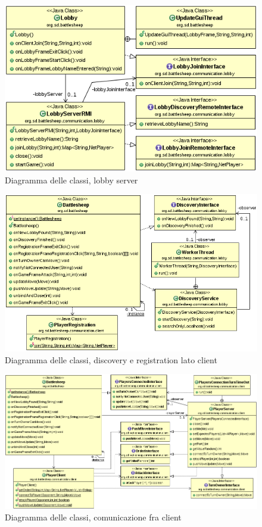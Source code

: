 \documentclass[a4paper,10pt]{scrartcl}
\begin{document}
\begin{figure}[!ht]
    \centering
\includegraphics[width=1.0\textwidth]{core/imgs/UML/LobbyCommunicationUML-noattr.png}
    \caption{Diagramma delle classi, lobby server}
    \label{fig:classlobby}
\end{figure}

\begin{figure}[!ht]
    \centering
\includegraphics[width=1.0\textwidth]{core/imgs/UML/RegistrationBattlesheepCommunicationUML-noattr.png}
    \caption{Diagramma delle classi, discovery e registration lato client}
    \label{fig:classlobbyclientside}
\end{figure}

\begin{figure}[!ht]
    \centering
\includegraphics[width=1.0\textwidth]{core/imgs/UML/GameBattlesheepCommunicationUML-noattr.png}
    \caption{Diagramma delle classi, comunicazione fra client}
    \label{fig:classgame}
\end{figure}
\end{document}
